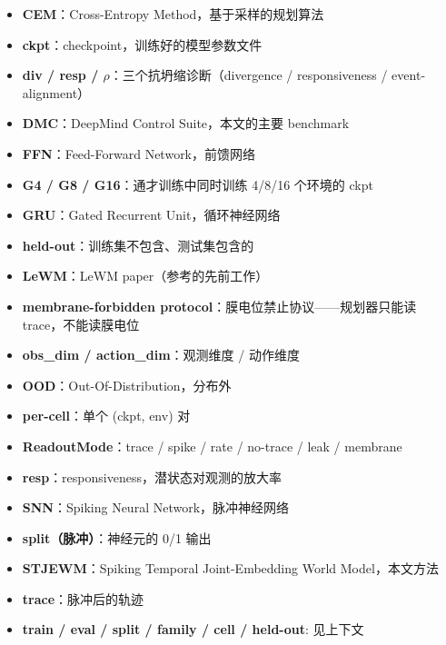 \documentclass[11pt,a4paper]{article}
\begin{document}
\begin{itemize}[leftmargin=2em]
    \item \textbf{CEM}：Cross-Entropy Method，基于采样的规划算法
    \item \textbf{ckpt}：checkpoint，训练好的模型参数文件
    \item \textbf{div / resp / \ensuremath{\rho}}：三个抗坍缩诊断（divergence / responsiveness / event-alignment）
    \item \textbf{DMC}：DeepMind Control Suite，本文的主要 benchmark
    \item \textbf{FFN}：Feed-Forward Network，前馈网络
    \item \textbf{G4 / G8 / G16}：通才训练中同时训练 4/8/16 个环境的 ckpt
    \item \textbf{GRU}：Gated Recurrent Unit，循环神经网络
    \item \textbf{held-out}：训练集不包含、测试集包含的
    \item \textbf{LeWM}：LeWM paper（参考的先前工作）
    \item \textbf{membrane-forbidden protocol}：膜电位禁止协议——规划器只能读 trace，不能读膜电位
    \item \textbf{obs\_dim / action\_dim}：观测维度 / 动作维度
    \item \textbf{OOD}：Out-Of-Distribution，分布外
    \item \textbf{per-cell}：单个 (ckpt, env) 对
    \item \textbf{ReadoutMode}：trace / spike / rate / no-trace / leak / membrane
    \item \textbf{resp}：responsiveness，潜状态对观测的放大率
    \item \textbf{SNN}：Spiking Neural Network，脉冲神经网络
    \item \textbf{split（脉冲）}：神经元的 0/1 输出
    \item \textbf{STJEWM}：Spiking Temporal Joint-Embedding World Model，本文方法
    \item \textbf{trace}：脉冲后的轨迹
    \item \textbf{train / eval / split / family / cell / held-out}: 见上下文
\end{itemize}
\end{document}
